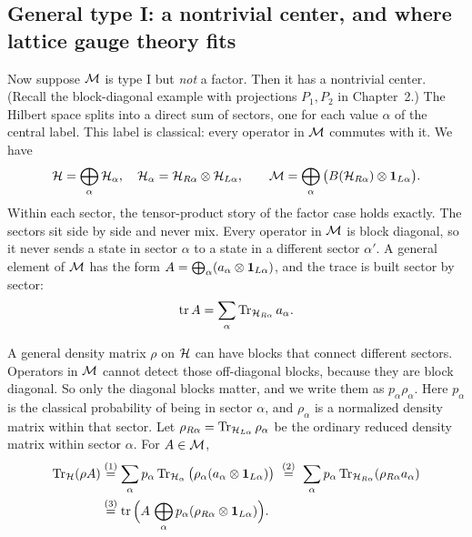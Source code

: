 \subsection*{General type I: a nontrivial center, and where lattice gauge theory fits}

Now suppose $\mathcal{M}$ is type I but \emph{not} a factor. Then it has a nontrivial center. (Recall the
block-diagonal example with projections $P_1,P_2$ in Chapter~2.) The Hilbert space splits into a direct sum of
sectors, one for each value $\alpha$ of the central label. This label is classical: every operator in $\mathcal{M}$
commutes with it. We have
\[
\mathcal{H}=\bigoplus_\alpha\mathcal{H}_\alpha, \quad \mathcal{H}_\alpha=\mathcal{H}_{R\alpha}\otimes\mathcal{H}_{L\alpha}, \qquad
\mathcal{M}=\bigoplus_\alpha\big(B(\mathcal{H}_{R\alpha})\otimes\mathbf{1}_{L\alpha}\big) .
\]
Within each sector, the tensor-product story of the factor case holds exactly. The sectors sit side by side and
never mix. Every operator in $\mathcal{M}$ is block diagonal, so it never sends a state in sector $\alpha$ to a state in
a different sector $\alpha'$. A general element of $\mathcal{M}$ has the form $A=\bigoplus_\alpha(a_\alpha\otimes
\mathbf{1}_{L\alpha})$, and the trace is built sector by sector:
\[
\operatorname{tr} A=\sum_\alpha\operatorname{Tr}_{\mathcal{H}_{R\alpha}}a_\alpha .
\]

A general density matrix $\rho$ on $\mathcal{H}$ can have blocks that connect different sectors. Operators in $\mathcal{M}$
cannot detect those off-diagonal blocks, because they are block diagonal. So only the diagonal blocks matter,
and we write them as $p_\alpha\rho_\alpha$. Here $p_\alpha$ is the classical probability of being in sector
$\alpha$, and $\rho_\alpha$ is a normalized density matrix within that sector. Let
$\rho_{R\alpha}=\operatorname{Tr}_{\mathcal{H}_{L\alpha}}\rho_\alpha$ be the ordinary reduced density matrix within sector $\alpha$.
For $A\in\mathcal{M}$,
\begin{align}
\operatorname{Tr}_{\mathcal{H}}(\rho A)
&\overset{(1)}{=} \sum_\alpha p_\alpha\operatorname{Tr}_{\mathcal{H}_\alpha}\big(\rho_\alpha(a_\alpha\otimes\mathbf{1}_{L\alpha})\big)
\ \overset{(2)}{=}\ \sum_\alpha p_\alpha\operatorname{Tr}_{\mathcal{H}_{R\alpha}}(\rho_{R\alpha}a_\alpha) \notag\\
&\overset{(3)}{=} \operatorname{tr}\Big(A\,\bigoplus_\alpha p_\alpha(\rho_{R\alpha}\otimes\mathbf{1}_{L\alpha})\Big) . \notag
\end{align}
\quad
{}\quad
{}

